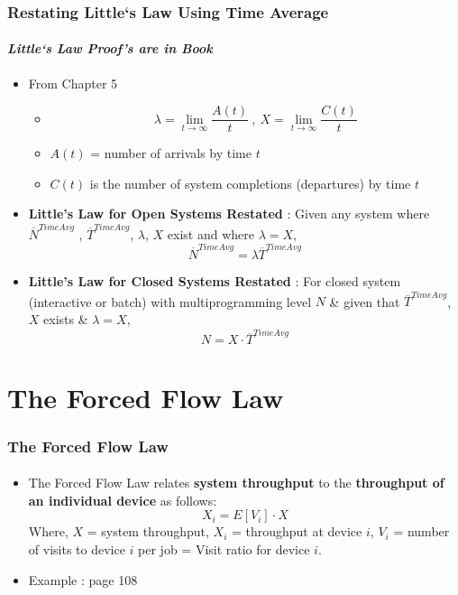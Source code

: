 \documentclass{beamer}
\begin{document}
\begin{frame}
\frametitle{Restating Little`s Law Using Time Average}
\framesubtitle{\textbf{\textit{Little`s Law Proof's are in Book}}}
\begin{itemize}
\item From Chapter 5 

\begin{itemize}
\item 
$$\lambda = {\lim}_{t \rightarrow \infty } \frac{A(t)}{t} \:, 
\: X = {\lim}_{t \rightarrow \infty } \frac{C(t)}{t} $$
\item $A(t)$ = number of arrivals by time $t$ 
\item $C(t)$ is the number of system completions (departures) by time $t$
\end{itemize}

\item \textbf{Little’s Law for Open Systems Restated} : Given any system where
$ \overline{N}^{Time Avg}$ , $ \overline{T}^{Time Avg}$, $\lambda$, $X$
exist and where $\lambda = X$, 
$$ \overline{N}^{Time Avg} = \lambda \overline{T}^{Time Avg} $$

\item \textbf{Little’s Law for Closed Systems Restated} : For closed
system (interactive or batch) with multiprogramming level $N$ \&  given that $ \overline{T}^{Time Avg}$,  $X$ exists \&  $\lambda = X$, 
$$ N  = X \cdot \overline{T}^{Time Avg} $$

\end{itemize}
	
\end{frame}

\section{ The Forced Flow Law}

\begin{frame}
\frametitle{ The Forced Flow Law}
\framesubtitle{\textbf{\textit{}}}
\begin{itemize}
\item The Forced Flow Law relates \textbf{system throughput} to the \textbf{throughput of an individual device} as follows:
$$X_i = E[V_i] \cdot X$$
Where,  $X$ = system throughput, $X_i$ = throughput at device $i$,
$V_i$ = number of visits to device $i$ per job = Visit ratio for device $i$.

\item Example : page 108

\end{itemize}
	
\end{frame}
\end{document}
